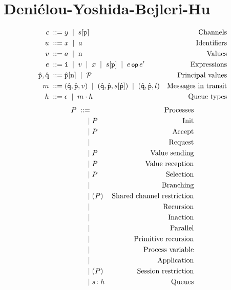 \documentclass{article}
\begin{document}
\section{Deni\'elou-Yoshida-Bejleri-Hu}

\begin{align*}
  c \; ::= \; & y \; \mid \; s[\mathtt{p}]   & \text{Channels} \\
  u \; ::= \; & x \; \mid \; a                    & \text{Identifiers}\\
  v \; ::= \; & a \; \mid \; \text{n}             & \text{Values}\\
  e \; ::= \; & \mathtt{i}
    \; \mid \; v
    \; \mid \; x
    \; \mid \; s[\mathtt{p}]
    \; \mid \; e\,\textsf{\upshape\small op}\,e'             & \text{Expressions}\\
  \hat{\mathtt{p}}, \hat{\mathtt{q}}
    \; ::= \; & \hat{\mathtt{p}}[\text{n}]
    \; \mid \; \mathcal{P}                     & \text{Principal values}\\
  m \; ::= \; & (\hat{\mathtt{q}},\hat{\mathtt{p}},v)
    \; \mid \; (\hat{\mathtt{q}},\hat{\mathtt{p}},s[\hat{\mathtt{p}}])
    \; \mid \; (\hat{\mathtt{q}},\hat{\mathtt{p}},l)
                                           & \text{Messages in transit}\\
  h \; ::= \; & \epsilon \; \mid \; m\cdot h       & \text{Queue types}\\
\end{align*}
\begin{align*}
  P \grmeq &               & \text{Processes}\\
    \grmor & \init uyP     & \text{Init}\\
    \grmor & \accept uyP   & \text{Accept}\\
    \grmor & \request as{} & \text{Request}\\
    \grmor & \send ceP     & \text{Value sending}\\
    \grmor & \recv cxP     & \text{Value reception}\\
    \grmor & \select clP   & \text{Selection}\\
    \grmor & \branch clP   & \text{Branching}\\
    \grmor & \restrict aP  & \text{Shared channel restriction}\\
    \grmor & \recur XP     & \text{Recursion}\\
    \grmor & \inact        & \text{Inaction}\\
    \grmor & \parcomp PQ   & \text{Parallel}\\
    \grmor & \primrec PiXQ & \text{Primitive recursion}\\
    \grmor & \vars X{}{}   & \text{Process variable}\\
    \grmor & \app Pi       & \text{Application}\\
    \grmor & \restrict sP  & \text{Session restriction}\\
    \grmor & s\colon h     & \text{Queues}\\
\end{align*}
\end{document}
